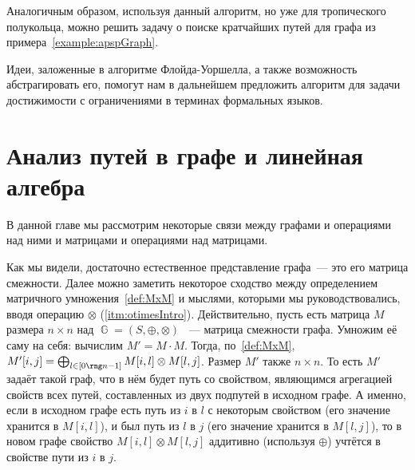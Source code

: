 Аналогичным образом, используя данный алгоритм, но уже для тропического полукольца, можно решить задачу о поиске кратчайших путей для графа из примера~\ref{example:apspGraph}.

Идеи, заложенные в алгоритме Флойда-Уоршелла, а также возможность абстрагировать его, помогут нам в дальнейшем предложить алгоритм для задачи достижимости с ограничениями в терминах формальных языков.


\section{Анализ путей в графе и линейная алгебра}

 В данной главе мы рассмотрим некоторые связи%
 между графами и операциями над ними и матрицами и операциями над матрицами.

 Как мы видели, достаточно естественное представление графа~--- это его матрица смежности.
 Далее можно заметить некоторое сходство между определением матричного умножения~\ref{def:MxM} и мыслями, которыми мы руководствовались, вводя операцию $\otimes$ (\ref{itm:otimesIntro}).
 Действительно, пусть есть матрица $M$ размера $n \times n$ над $\BbbG = (S, \oplus, \otimes)$%
 ~--- матрица смежности графа.
 Умножим её саму на себя: вычислим $M'= M \cdot M$.
 Тогда, по~\ref{def:MxM}, $M'[i, j] = \bigoplus_{l \in [0 \rng n-1]} M[i, l] \otimes M[l, j]$.
 Размер $M'$ также $n \times n$.
 То есть $M'$ задаёт такой граф, что в нём будет путь со свойством, являющимся агрегацией свойств всех путей, составленных из двух подпутей в исходном графе.
 А именно, если в исходном графе есть путь из $i$ в $l$ с некоторым свойством (его значение хранится в $M[i, l]$), и был путь из $l$ в $j$ (его значение хранится в $M[l,j]$), то в новом графе свойство $M[i, l] \otimes M[l, j]$ аддитивно (используя $\oplus$) учтётся в свойстве пути из $i$ в $j$.

